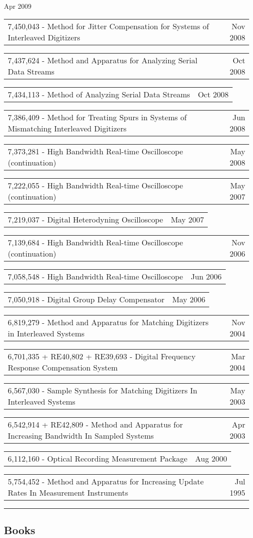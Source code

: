 \documentclass[10pt,letterpaper]{extarticle}
\makeatletter
\newcommand{\headerrow}[2]
{\begin{tabular*}{\linewidth}{l@{\extracolsep{\fill}}r}
	#1 &
	#2 \\
\end{tabular*}}
\makeatother
\begin{document}
		{Apr 2009}		
\headerrow
		{7,450,043 - Method for Jitter Compensation for Systems of Interleaved Digitizers}
		{Nov 2008}
\headerrow
		{7,437,624 - Method and Apparatus for Analyzing Serial Data Streams}
		{Oct 2008}
\headerrow
		{7,434,113 - Method of Analyzing Serial Data Streams}
		{Oct 2008}
\headerrow
		{7,386,409 - Method for Treating Spurs in Systems of Mismatching Interleaved Digitizers}
		{Jun 2008}
\headerrow
		{7,373,281 - High Bandwidth Real-time Oscilloscope (continuation)}
		{May 2008}
\headerrow
		{7,222,055 - High Bandwidth Real-time Oscilloscope (continuation)}
		{May 2007}
\headerrow
		{7,219,037 - Digital Heterodyning Oscilloscope}
		{May 2007}
\headerrow
		{7,139,684 - High Bandwidth Real-time Oscilloscope (continuation)}
		{Nov 2006}
\headerrow
		{7,058,548 - High Bandwidth Real-time Oscilloscope}
		{Jun 2006}
\headerrow
		{7,050,918 - Digital Group Delay Compensator}
		{May 2006}
\headerrow
		{6,819,279 - Method and Apparatus for Matching Digitizers in Interleaved Systems}
		{Nov 2004}
\headerrow
		{6,701,335 + RE40,802 + RE39,693 - Digital Frequency Response Compensation System}
		{Mar 2004}
\headerrow
		{6,567,030 - Sample Synthesis for Matching Digitizers In Interleaved Systems}
		{May 2003}
\headerrow
		{6,542,914 + RE42,809 - Method and Apparatus for Increasing Bandwidth In Sampled Systems}
		{Apr 2003}
\headerrow
		{6,112,160 - Optical Recording Measurement Package}
		{Aug 2000}
\headerrow
		{5,754,452 - Method and Apparatus for Increasing Update Rates In Measurement Instruments}
		{Jul 1995}
\vspace{0.2em}
\clearpage
\hrule
\vspace{-1em}\subsection*{\Large Books}\vspace{-0.5em}
\end{document}
